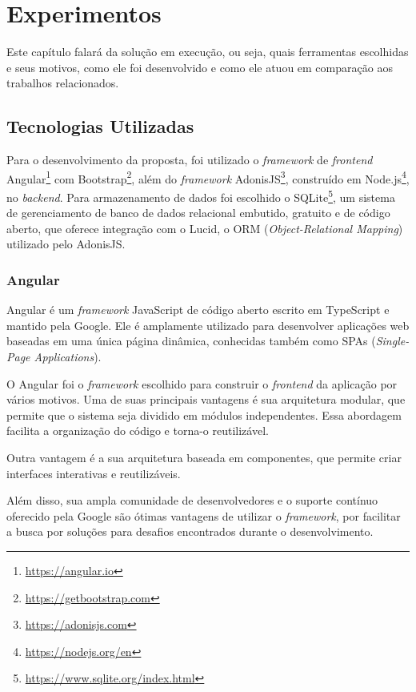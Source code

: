 \chapter{Experimentos}\label{chp:EXPERIMENTOS}

Este capítulo falará da solução em execução, ou seja, quais ferramentas escolhidas e seus motivos, como ele foi desenvolvido e como ele atuou em comparação aos trabalhos relacionados.

\section{Tecnologias Utilizadas}

Para o desenvolvimento da proposta, foi utilizado o \textit{framework} de \textit{frontend} Angular\footnote{\url{https://angular.io}} com Bootstrap\footnote{\url{https://getbootstrap.com}}, além do \textit{framework} AdonisJS\footnote{\url{https://adonisjs.com}}, construído em Node.js\footnote{\url{https://nodejs.org/en}}, no \textit{backend}. Para armazenamento de dados foi escolhido o SQLite\footnote{\url{https://www.sqlite.org/index.html}}, um sistema de gerenciamento de banco de dados relacional embutido, gratuito e de código aberto, que oferece integração com o Lucid, o ORM (\textit{Object-Relational Mapping}) utilizado pelo AdonisJS.

\subsection{Angular}
Angular é um \textit{framework} JavaScript de código aberto escrito em TypeScript e mantido pela Google. Ele é amplamente utilizado para desenvolver aplicações web baseadas em uma única página dinâmica, conhecidas também como SPAs (\textit{Single-Page Applications}).

O Angular foi o \textit{framework} escolhido para construir o \textit{frontend} da aplicação por vários motivos. Uma de suas principais vantagens é sua arquitetura modular, que permite que o sistema seja dividido em módulos independentes. Essa abordagem facilita a organização do código e torna-o reutilizável. 

Outra vantagem é a sua arquitetura baseada em componentes, que permite criar interfaces interativas e reutilizáveis. 

Além disso, sua ampla comunidade de desenvolvedores e o suporte contínuo oferecido pela Google são ótimas vantagens de utilizar o \textit{framework}, por facilitar a busca por soluções para desafios encontrados durante o desenvolvimento.

